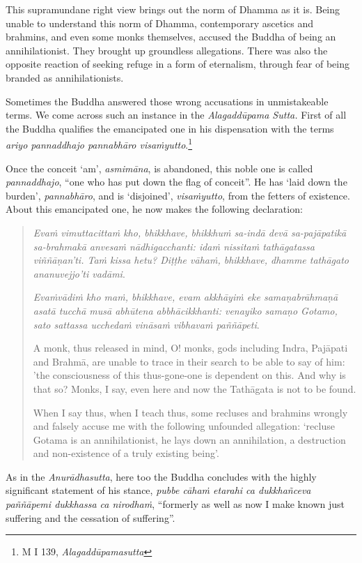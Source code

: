 This supramundane right view brings out the norm of Dhamma as it is. Being unable to understand this norm of Dhamma, contemporary ascetics and brahmins, and even some monks themselves, accused the Buddha of being an annihilationist. They brought up groundless allegations. There was also the opposite reaction of seeking refuge in a form of eternalism, through fear of being branded as annihilationists.

Sometimes the Buddha answered those wrong accusations in unmistakeable terms. We come across such an instance in the \emph{Alagaddūpama Sutta.} First of all the Buddha qualifies the emancipated one in his dispensation with the terms \emph{ariyo pannaddhajo pannabhāro visaṁyutto}.\footnote{M I 139, \emph{Alagaddūpamasutta}}

Once the conceit `am', \emph{asmimāna}, is abandoned, this noble one is called \emph{pannaddhajo}, ``one who has put down the flag of conceit''. He has `laid down the burden', \emph{pannabhāro}, and is `disjoined', \emph{visaṁyutto}, from the fetters of existence. About this emancipated one, he now makes the following declaration:

\begin{quote}
\emph{Evaṁ vimuttacittaṁ kho, bhikkhave, bhikkhuṁ sa-indā devā sa-pajāpatikā sa-brahmakā anvesaṁ nādhigacchanti: idaṁ nissitaṁ tathāgatassa viññāṇan'ti. Taṁ kissa hetu? Diṭṭhe vāhaṁ, bhikkhave, dhamme tathāgato ananuvejjo'ti vadāmi}.

\emph{Evaṁvādiṁ kho maṁ, bhikkhave, evam akkhāyiṁ eke samaṇabrāhmaṇā asatā tucchā musā abhūtena abbhācikkhanti: venayiko samaṇo Gotamo, sato sattassa ucchedaṁ vināsaṁ vibhavaṁ paññāpeti}.

A monk, thus released in mind, O! monks, gods including Indra, Pajāpati and Brahmā, are unable to trace in their search to be able to say of him: 'the consciousness of this thus-gone-one is dependent on this. And why is that so? Monks, I say, even here and now the Tathāgata is not to be found.

When I say thus, when I teach thus, some recluses and brahmins wrongly and falsely accuse me with the following unfounded allegation: `recluse Gotama is an annihilationist, he lays down an annihilation, a destruction and non-existence of a truly existing being'.
\end{quote}

As in the \emph{Anurādhasutta}, here too the Buddha concludes with the highly significant statement of his stance, \emph{pubbe cāhaṁ etarahi ca dukkhañceva paññāpemi dukkhassa ca nirodhaṁ}, ``formerly as well as now I make known just suffering and the cessation of suffering''.

